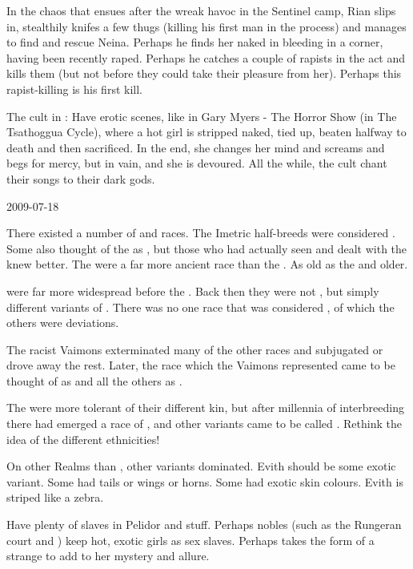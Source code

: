   In the chaos that ensues after the \banes wreak havoc in the Sentinel camp, Rian slips in, stealthily knifes a few thugs (killing his first man in the process) and manages to find and rescue Neina.
  Perhaps he finds her naked in bleeding in a corner, having been recently raped. 
  Perhaps he catches a couple of rapists in the act and kills them (but not before they could take their pleasure from her). 
  Perhaps this rapist-killing is his first kill. 


The cult in \Redce:
  Have erotic scenes, like in Gary Myers - The Horror Show (in The Tsathoggua Cycle), where a hot girl is stripped naked, tied up, beaten halfway to death and then sacrificed. 
  In the end, she changes her mind and screams and begs for mercy, but in vain, and she is devoured. 
  All the while, the cult chant their songs to their dark gods. 



2009-07-18

There existed a number of \quo{\demiscatha} and \quo{\demihuman} races. 
The Imetric half-breeds were considered \demiscathae.
Some also thought of the \nagae as \demiscathae, but those who had actually seen and dealt with the \nagae knew better.
The \nagae were a far more ancient race than the \scathae. 
As old as the \dragons and older. 

\Demihumans were far more widespread before the \VaimonCaliphate. 
Back then they were not \quo{\demihumans}, but simply different variants of \humans.
There was no one race that was considered  \humans, of which the others were deviations. 

The racist Vaimons exterminated many of the other \human races and subjugated or drove away the rest. 
Later, the race which the Vaimons represented came to be thought of as  \humans and all the others as \demihumans. 

The \scathae were more tolerant of their different kin, but after millennia of interbreeding there had emerged a race of  \scathae, and other variants came to be called \quo{\demiscathae}. 
Rethink the idea of the different \scatha ethnicities!

On other Realms than \Azmith, other \human variants dominated.
Evith should be some exotic \human variant. 
Some had tails or wings or horns. 
Some had exotic skin colours. 
Evith is striped like a zebra. 

Have plenty of \demihuman slaves in Pelidor and stuff. 
Perhaps nobles (such as the Rungeran court and \ishrah) keep hot, exotic \demihuman girls as sex slaves. 
Perhaps \Takestsha takes the form of a strange \demihuman to add to her mystery and allure.


